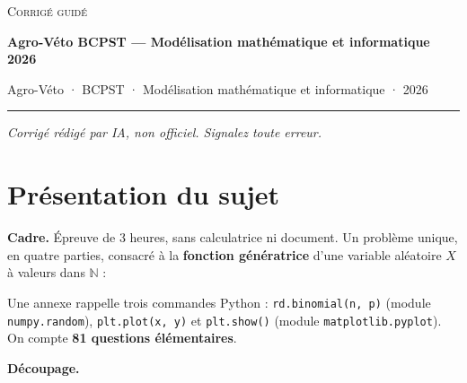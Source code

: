 \documentclass[11pt,a4paper]{article}
\newcommand{\equationajustee}[1]{%
  \sbox{\boiteequation}{$\displaystyle #1$}%
  \ifdim\wd\boiteequation>\linewidth
    \[\resizebox{\linewidth}{!}{\usebox{\boiteequation}}\]%
  \else
    \[#1\]%
  \fi}
\begin{document}
\thispagestyle{plain}
\begin{center}
  {\small\scshape Corrigé guidé}\par\smallskip
  {\LARGE\bfseries Agro-Véto BCPST — Modélisation mathématique et informatique 2026\par}\medskip
  {\large Agro-Véto · BCPST · Modélisation mathématique et informatique · 2026\par}
\end{center}
\vspace{2pt}\hrule\vspace{8pt}

\emph{Corrigé rédigé par IA, non officiel. Signalez toute erreur.}

\hypertarget{pruxe9sentation-du-sujet}{%
\section{Présentation du sujet}\label{pruxe9sentation-du-sujet}}

\textbf{Cadre.} Épreuve de 3 heures, sans calculatrice ni document. Un problème unique, en quatre parties, consacré à la \textbf{fonction génératrice} d'une variable aléatoire \(X\) à valeurs dans \(\mathbb N\) :

\equationajustee{G_X(t)=\sum_{n\in\mathbb N}P(X=n)\,t^n .}

Une annexe rappelle trois commandes Python : \texttt{rd.binomial(\allowbreak{}n,\allowbreak{}\ p)\allowbreak{}} (module \texttt{numpy.random}), \texttt{plt.plot(x,\ y)} et \texttt{plt.show()} (module \texttt{matplotlib.pyplot}). On compte \textbf{81 questions élémentaires}.

\textbf{Découpage.}
\end{document}
